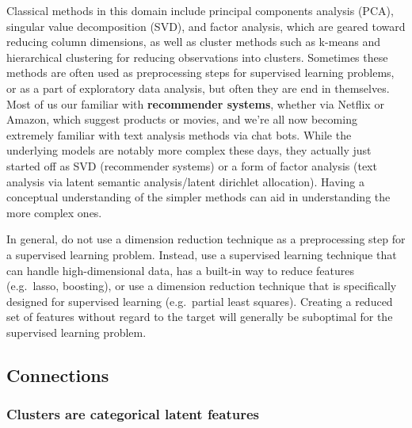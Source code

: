 \documentclass[
  letterpaper,
]{krantz}
\begin{document}
Classical methods in this domain include principal components analysis
(PCA), singular value decomposition (SVD), and factor analysis, which
are geared toward reducing column dimensions, as well as cluster methods
such as k-means and hierarchical clustering for reducing observations
into clusters. Sometimes these methods are often used as preprocessing
steps for supervised learning problems, or as a part of exploratory data
analysis, but often they are end in themselves. Most of us our familiar
with \textbf{recommender systems}, whether via Netflix or Amazon, which
suggest products or movies, and we're all now becoming extremely
familiar with text analysis methods via chat bots. While the underlying
models are notably more complex these days, they actually just started
off as SVD (recommender systems) or a form of factor analysis (text
analysis via latent semantic analysis/latent dirichlet allocation).
Having a conceptual understanding of the simpler methods can aid in
understanding the more complex ones.

\begin{tcolorbox}[enhanced jigsaw, leftrule=.75mm, breakable, colback=white, left=2mm, colframe=quarto-callout-tip-color-frame, toprule=.15mm, arc=.35mm, rightrule=.15mm, bottomrule=.15mm, opacityback=0]
\begin{minipage}[t]{5.5mm}
\textcolor{quarto-callout-tip-color}{\faLightbulb}
\end{minipage}%
\begin{minipage}[t]{\textwidth - 5.5mm}

In general, do not use a dimension reduction technique as a
preprocessing step for a supervised learning problem. Instead, use a
supervised learning technique that can handle high-dimensional data, has
a built-in way to reduce features (e.g.~lasso, boosting), or use a
dimension reduction technique that is specifically designed for
supervised learning (e.g.~partial least squares). Creating a reduced set
of features without regard to the target will generally be suboptimal
for the supervised learning problem.

\end{minipage}%
\end{tcolorbox}

\subsection{Connections}\label{connections}

\subsubsection{Clusters are categorical latent
features}\label{clusters-are-categorical-latent-features}
\end{document}
